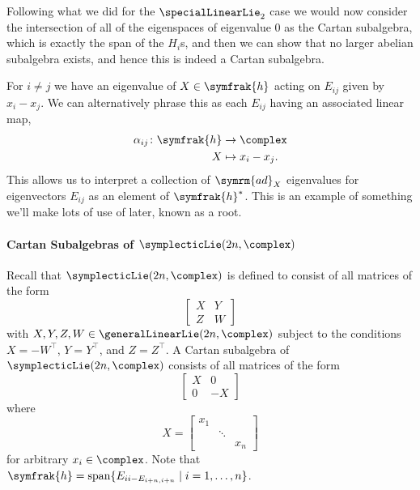 \documentclass[fleqn]{NotesClass}
\DeclareMathOperator{\Span}{span}
\newcommand{\trans}{{\top}}
\newcommand{\ad}{\symrm{ad}}
\newcommand{\csa}{\symfrak{h}}
\begin{document}
    Following what we did for the \(\specialLinearLie_2\) case we would now consider the intersection of all of the eigenspaces of eigenvalue \(0\) as the Cartan subalgebra, which is exactly the span of the \(H_i\)s, and then we can show that no larger abelian subalgebra exists, and hence this is indeed a Cartan subalgebra.
    
    For \(i \ne j\) we have an eigenvalue of \(X \in \csa\) acting on \(E_{ij}\) given by \(x_i - x_j\).
    We can alternatively phrase this as each \(E_{ij}\) having an associated linear map,
    \begin{align}
        \alpha_{ij} \colon \csa &\to \complex\\
        X &\mapsto x_i - x_j.
    \end{align}
    This allows us to interpret a collection of \(\ad_X\) eigenvalues for eigenvectors \(E_{ij}\) as an element of \(\csa^*\).
    This is an example of something we'll make lots of use of later, known as a root.
    
    \paragraph{Cartan Subalgebras of \(\symplecticLie(2n, \complex)\)}
    Recall that \(\symplecticLie(2n, \complex)\) is defined to consist of all matrices of the form
    \begin{equation}
        \left[
        \begin{array}{c|c}
            X & Y\\ \hline
            Z & W
        \end{array}
        \right]
    \end{equation}
    with \(X, Y, Z, W \in \generalLinearLie(2n, \complex)\) subject to the conditions \(X = -W^{\trans}\), \(Y = Y^{\trans}\), and \(Z = Z^{\trans}\).
    A Cartan subalgebra of \(\symplecticLie(2n, \complex)\) consists of all matrices of the form
    \begin{equation}
        \left[
        \begin{array}{c|c}
            X & 0\\ \hline
            0 & -X
        \end{array}
        \right]
    \end{equation}
    where
    \begin{equation}
        X =
        \begin{bmatrix}
            x_1 \\
            & \ddots \\
            && x_n
        \end{bmatrix}
    \end{equation}
    for arbitrary \(x_i \in \complex\).
    Note that \(\csa = \Span\{E_{ii - E_{i+n, i+n}} \mid i = 1, \dotsc, n\}\).
    
\end{document}
